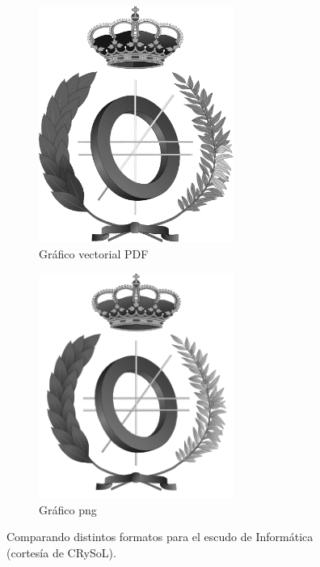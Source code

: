 \documentclass[11pt,a4paper]{article}
\begin{document}
\begin{figure}[H]
	\centering
	\begin{subfigure}[b]{0.3\textwidth}
		\centering
		\includegraphics[width=0.7\textwidth]{escudoInfBW.pdf}
		\caption{Gráfico vectorial \textsf{PDF}}\label{fig:escudoPDF}
	\end{subfigure}
	\begin{subfigure}[b]{0.3\textwidth}
		\centering
		\includegraphics[width=0.7\textwidth]{escudoInfBW.png}
		\caption{Gráfico png}\label{fig:escudoPNG}
	\end{subfigure}
	\caption[Comparación \textsf{PDF} y png]{Comparando distintos formatos para el escudo de Informática (cortesía de CRySoL).}
	\label{fig:escudo}
\end{figure}
\end{document}
